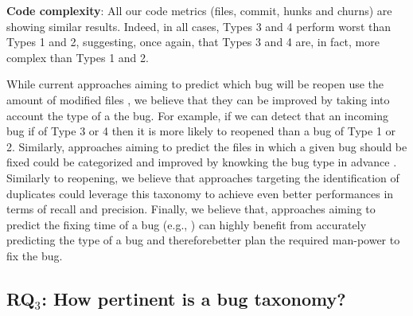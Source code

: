 {\bf Code complexity}: All our code metrics (files, commit, hunks and churns) are showing similar results.
Indeed, in all cases, Types 3 and 4 perform worst than Types 1 and 2, suggesting, once again, that Types 3 and 4 are, in fact, more complex than Types 1 and 2.

While current approaches aiming to predict which bug will be reopen use the amount of modified files \cite{Shihab2010,Zimmermann2012,Lo2013}, we believe that they can be improved by taking into account the type of a the bug.
For example, if we can detect that an incoming bug if of Type 3 or 4 then it is more likely to reopened than a bug of Type 1 or 2.
Similarly, approaches aiming to predict the files in which a given bug should be fixed could be categorized and improved by knowking the bug type in advance \cite{Zhou2012,Kim2013a}.
Similarly to reopening, we believe that approaches targeting the identification of
duplicates \cite{Bettenburg2008a,Jalbert2008,Sun2010,Tian2012a}  could leverage this taxonomy to
achieve even better performances in terms of recall and
precision.
Finally, we believe that, approaches aiming to predict the fixing
time of a bug (e.g., \cite{Panjer2007,Bhattacharya2011,Zhang2013}) can highly benefit from
accurately predicting the type of a bug and thereforebetter
plan the required man-power to fix the bug.


\subsection{RQ$_3$: How pertinent is a bug taxonomy?}
